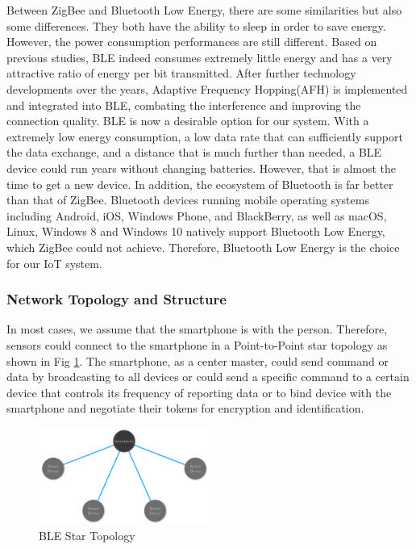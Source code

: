 \documentclass[10pt,journal,final,a4paper,nofonttune]{IEEEtran}
\begin{document}
Between ZigBee and Bluetooth Low Energy, there are some similarities but also some differences. They both have the ability to sleep in order to save energy. However, the power consumption performances are still different.  
Based on previous studies\cite{siekkinen2012low}, BLE indeed consumes extremely little energy and has a very attractive ratio of energy per bit transmitted. After further technology developments over the years, Adaptive Frequency Hopping(AFH) is implemented and integrated into BLE, combating the interference and improving the connection quality. BLE is now a desirable option for our system. With a extremely low energy consumption, a low data rate that can sufficiently support the data exchange, and a distance that is much further than needed, a BLE device could run years without changing batteries. However, that is almost the time to get a new device. In addition, the ecosystem of Bluetooth is far better than that of ZigBee. Bluetooth devices running mobile operating systems including Android, iOS, Windows Phone, and BlackBerry, as well as macOS, Linux, Windows 8 and Windows 10 natively support Bluetooth Low Energy, which ZigBee could not achieve. Therefore, Bluetooth Low Energy is the choice for our IoT system.

\subsubsection*{Network Topology and Structure}

In most cases, we assume that the smartphone is with the person. Therefore, sensors could connect to the smartphone in a Point-to-Point star topology as shown in Fig \ref{fig_topology}. 
The smartphone, as a center master, could send command or data by broadcasting to all devices or could send a specific command to a certain device that controls its frequency of reporting data or to bind device with the smartphone and negotiate their tokens for encryption and identification. 

\begin{figure}[!t]
    \centering
    \includegraphics[width=0.5\textwidth]{Topology-Labeled.png}
    \caption{BLE Star Topology}
    \label{fig_topology}
\end{figure}
\end{document}
